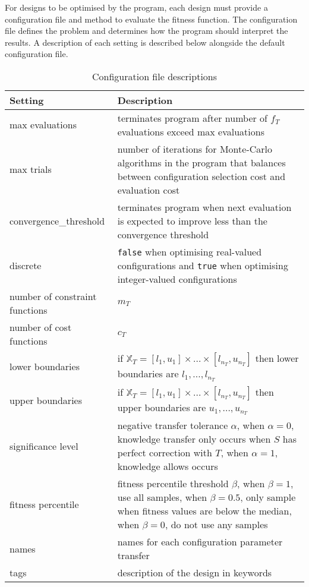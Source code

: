 \documentclass[10pt,a4paper]{article}
\begin{document}
For designs to be optimised by the program, each design must provide a configuration file and method to evaluate the fitness function. The configuration file defines the problem and determines how the program should interpret the results. A description of each setting is described below alongside the default configuration file.

\noindent
\begin{table}[H]
	\begin{tabularx}{\linewidth}{l X}
		\hline
		Setting & Description\\
		\hline
		max evaluations & terminates program after number of $f_T$ evaluations exceed max evaluations\\
		max trials & number of iterations for Monte-Carlo algorithms in the program that balances between configuration selection cost and evaluation cost\\
		convergence\_threshold & terminates program when next evaluation is expected to improve less than the convergence threshold\\
		discrete & \verb|false| when optimising real-valued configurations and \verb|true| when optimising integer-valued configurations\\
		number of constraint functions & $m_T$\\
		number of cost functions & $c_T$\\
		lower boundaries & if $\mathbb{X}_T=[l_1,u_1]\times...\times[l_{n_T},u_{n_T}]$ then lower boundaries are $l_1,...,l_{n_T}$\\
		upper boundaries & if $\mathbb{X}_T=[l_1,u_1]\times...\times[l_{n_T},u_{n_T}]$ then upper boundaries are $u_1,...,u_{n_T}$\\
		significance level & negative transfer tolerance $\alpha$, when $\alpha=0$, knowledge transfer only occurs when $S$ has perfect correction with $T$, when $\alpha=1$, knowledge allows occurs\\
		fitness percentile & fitness percentile threshold $\beta$, when $\beta=1$, use all samples, when $\beta=0.5$, only sample when fitness values are below the median, when $\beta=0$, do not use any samples\\
		names & names for each configuration parameter transfer\\
		tags & description of the design in keywords\\
		\hline
	\end{tabularx}
	\caption{Configuration file descriptions}
\end{table}
\end{document}
